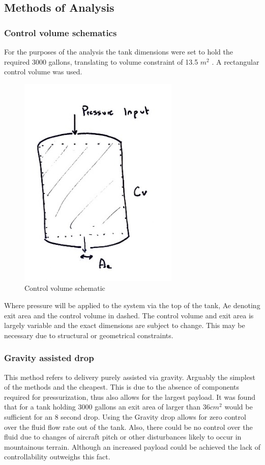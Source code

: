 \subsection{Methods of Analysis}
\subsubsection{Control volume schematics}
For the purposes of the analysis the tank dimensions were set to hold the required 3000 gallons, translating to volume constraint of 13.5 $m^{2}$ . A rectangular control volume was used.

\begin{figure}[!htbp]
\centering
\includegraphics[width= 0.2\linewidth]{../figures/control_volume_schematic.jpg}
\caption{Control volume schematic}
\label{fig:control_volume_schematic}
\end{figure}
\FloatBarrier

Where pressure will be applied to the system via the top of the tank, Ae denoting exit area and the control volume in dashed. The control volume and exit area is largely variable and the exact dimensions are subject to change. This may be necessary due to structural or geometrical constraints.

\subsubsection{Gravity assisted drop}
This method refers to delivery purely assisted via gravity. Arguably the simplest of the methods and the cheapest. This is due to the absence of components required for pressurization, thus also allows for the largest payload. It was found that for a tank holding 3000 gallons an exit area of larger than $36 cm^{2}$  would be sufficient for an 8 second drop. 
Using the Gravity drop allows for zero control over the fluid flow rate out of the tank. Also, there could be no control over the fluid due to changes of aircraft pitch or other disturbances likely to occur in mountainous terrain. Although an increased payload could be achieved the lack of controllability outweighs this fact.

